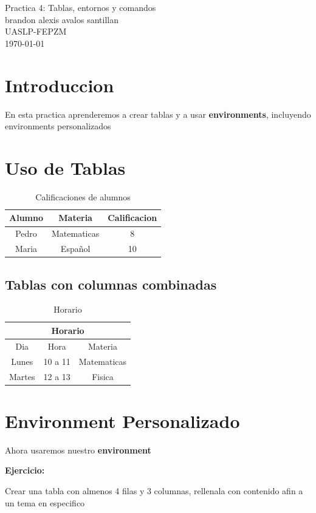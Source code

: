 \documentclass[12pt]{article}
\newcommand{\minombre}{brandon alexis avalos santillan}
\newcommand{\nombrepractica}{Practica 4: Tablas, entornos y comandos}
\newcommand{\universidad}{UASLP-FEPZM}
\newenvironment{ejercicio}
{
 \vspace{0.3cm}
\noindent\textbf{Ejercicio:}
\begin{itshape} %
}
{
   \end{itshape}
\vspace{0.3cm}
}
\begin{document}
\begin{center}
    {\LARGE \nombrepractica}\\[0.3cm]
\vspace{10cm}
{\Large  \minombre}\\
\vspace{10cm}
\universidad\\
{\large \today}
\end{center}

\section{Introduccion}
En esta practica aprenderemos a crear tablas y a usar \textbf{environments}, incluyendo environments personalizados

\section{Uso de Tablas}
\begin{table}[h]
    \centering
    \begin{tabular}{c|c|c}
         Alumno&Materia&Calificacion  \\ 
         \hline
         Pedro&Matematicas&8\\
         Maria&Español&10\\
    \end{tabular}
    \caption{Calificaciones de alumnos}
    \label{Calificaciones}
\end{table}
\subsection{Tablas con columnas combinadas}
\begin{table}[h]
    \centering
    \begin{tabular}{c|c|c}
    \hline
    \multicolumn{3}{|c|}{Horario}\\ \hline
    Dia&Hora&Materia\\ \hline
    Lunes&10 a 11&Matematicas\\ \hline
    Martes&12 a 13&Fisica\\ \hline
    
    \end{tabular}
    \caption{Horario}
    \label{Horarario}

\section{Environment Personalizado}
Ahora usaremos nuestro \textbf{environment}

\begin{ejercicio}
    Crear una tabla con almenos 4 filas y 3 columnas, rellenala con contenido afin a un tema en especifico
\end{ejercicio}



\end{table}
\end{document}
